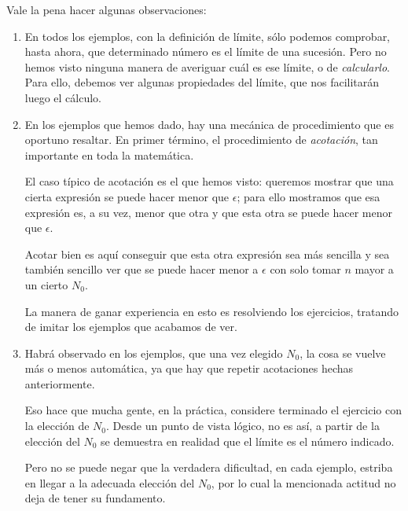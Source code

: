 \begin{remark}
    Vale la pena hacer algunas observaciones:
    \begin{enumerate}
        \item En todos los ejemplos, con la definición de límite, sólo podemos comprobar, hasta ahora, que determinado número es el límite de una sucesión. Pero no hemos visto ninguna manera de averiguar cuál es ese límite, o de \emph{calcularlo}. Para ello, debemos ver algunas propiedades del límite, que nos facilitarán luego el cálculo.
        \item En los ejemplos que hemos dado, hay una mecánica de procedimiento que es oportuno resaltar. En primer término, el procedimiento de \emph{acotación}, tan importante en toda la matemática. 
        
        El caso típico de acotación es el que hemos visto: queremos mostrar que una cierta expresión se puede hacer menor que $\epsilon$; para ello mostramos que esa expresión es, a su vez, menor que otra y que esta otra se puede hacer menor que $\epsilon$. 
        
        Acotar bien es aquí conseguir que esta otra expresión sea más sencilla y sea también sencillo ver que se puede hacer menor a $\epsilon$ con solo tomar $n$ mayor a un cierto $N_0$.

        La manera de ganar experiencia en esto es resolviendo los ejercicios, tratando de imitar los ejemplos que acabamos de ver.

        \item Habrá observado en los ejemplos, que una vez elegido $N_0$, la cosa se vuelve más o menos automática, ya que hay que repetir acotaciones hechas anteriormente.
        

        Eso hace que mucha gente, en la práctica, considere terminado el ejercicio con la elección de $N_0$. Desde un punto de vista lógico, no es así, a partir de la elección del $N_0$ se demuestra en realidad que el límite es el número indicado.

        Pero no se puede negar que la verdadera dificultad, en cada ejemplo, estriba en llegar a la adecuada elección del $N_0$, por lo cual la mencionada actitud no deja de tener su fundamento.  
        
    \end{enumerate}
\end{remark}

